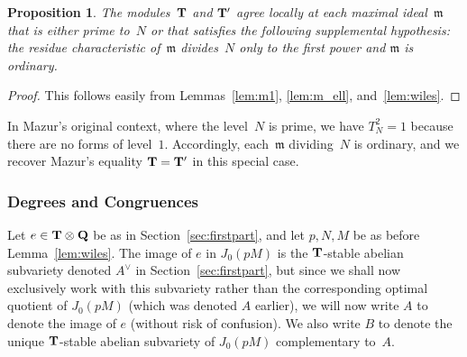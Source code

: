 \documentclass[10pt,twoside]{article}
\newcommand{\edit}[1]{\footnote{EDIT: #1}\marginpar{\hfill {\sf \thefootnote}}}
\newcommand{\Q}{{\bf{Q}}}
\newcommand{\T}{{\bf{T}}}
\newcommand{\m}{{\mathfrak{m}}}
\newcommand{\tensor}{\otimes}
\newcommand{\Adual}{A^{\vee}}
\newcommand{\comment}[1]{}
\newtheorem{prop}[lem]{Proposition}
\theoremstyle{definition}
\begin{document}
\begin{prop} \label{prop:TT'}
The modules~$\T$ 
and $\T'$ agree locally at each maximal ideal~$\m$ that is either prime
to~$N$ or that satisfies the following supplemental hypothesis: the
residue characteristic of~$\m$ divides~$N$ only to the first power
and $\m$ is ordinary.  
\end{prop}
\begin{proof}
This follows easily from Lemmas~\ref{lem:m1}, \ref{lem:m_ell},
and~\ref{lem:wiles}.
\end{proof}
\comment{
Wiles's lemma and the standard $q$-expansion argument
(Lemma~\ref{lem:m_ell} and Lemma~\ref{lem:wiles}) imply that~$\T$
and~$\T'$ agree locally at each rational prime that is prime to the
level $pM$, and also at each maximal ideal~$\m$ dividing~$p$ that is
ordinary, in the sense that $T_p \not\in \m$.  A more palatable
description of the situation involves considering the Hecke
algebra~$\T$ and its saturation~$\T'$ at some level $N\geq 1$.  Then
$\T=\T'$ locally at each maximal ideal $\m$ that is either prime
to~$N$ or that satisfies the following supplemental hypothesis: the
residue characteristic of~$\m$ divides~$N$ only to the first power
and~$\m$ is ordinary. 
}

In Mazur's original context, where the level~$N$ is
prime, we have $T_N^2=1$ because there are no forms of
level~$1$. Accordingly, each~$\m$ dividing~$N$ is ordinary, and we
recover Mazur's equality $\T=\T'$ in this special case.

\subsubsection{Degrees and Congruences} \label{sec:degrees}


Let $e \in \T\tensor\Q$ be as in Section~\ref{sec:firstpart},
and let $p,N,M$ be as before Lemma~\ref{lem:wiles}.
The image of $e$ in $J_0(pM)$ is the $\T$-stable abelian subvariety
denoted $\Adual$ in Section~\ref{sec:firstpart}, but since we shall
now exclusively work with this subvariety rather than the
corresponding optimal quotient of $J_0(pM)$ (which was denoted $A$
earlier), we will now write $A$ to denote the image of $e$ (without
risk of confusion).  We also write $B$ to denote the unique
$\T$-stable abelian subvariety of $J_0(pM)$ complementary to~$A$.
\end{document}
